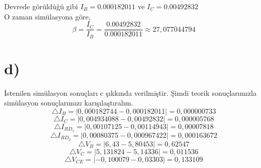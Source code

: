 \documentclass[11pt]{article}
\begin{document}
Devrede görüldüğü gibi $I_B = 0.000182011$ ve $I_C = 0.00492832$\\
O zaman simülasyona göre,
$$\beta = \frac{I_C}{I_B} = \frac{0.00492832}{0.000182011} \approx 27,077044794$$
\pagebreak
\section{d) }
İstenilen simülasyon sonuçları c şıkkında verilmiştir. Şimdi teorik sonuçlarımızla simülasyon sonuçlarımızı karışılaştıralım.
 $$\triangle I_B = | 0,000182744 - 0,000182011| = 0,000000733$$
 $$\triangle I_C = | 0,004934088 - 0,00492832| = 0,000005768$$
 $$\triangle I_{{RD_1}} = | 0,00107125 - 0,00114943| = 0,00007818$$
 $$\triangle I_{{RD_2}} = | 0,00080375 - 0,000967422| =0,000163672$$
 $$\triangle V_{B} = | 6,43 - 5,80453| =0,62547$$
 $$\triangle V_{C} = | 5,131824 - 5,14336| =0,011536$$
 $$\triangle V_{{CE}} = | -0,100079 - 0,03303| =0,133109$$
\end{document}
